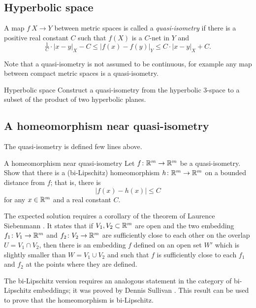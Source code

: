 \subsection*{Hyperbolic space}

A map $f\:X\to Y$ between metric spaces is called a \emph{quasi-isometry} if there is a positive real constant $C$ such that $f(X)$ is a $C$-net in $Y$ and
$$\tfrac{1}{C}\cdot|x-y|_X-C
\le 
|f(x)-f(y)|_Y\le C\cdot|x-y|_X+C.$$

Note that a quasi-isometry is not assumed to be continuous, for example any map between compact metric spaces is a quasi-isometry.

\begin{pr}{}{Hyperbolic space}\label{Hyperbolic space}
Construct a quasi-isometry
from the hyperbolic $3$-space 
to a subset 
of the product of two hyperbolic planes.
\end{pr}

\subsection*{A homeomorphism near quasi-isometry\thm}

The quasi-isometry is defined few lines above.

\begin{pr}{\thm}{A homeomorphism near quasi-isometry}\label{hom-near-QI} 
Let $f\colon\mathbb{R}^m\to\mathbb{R}^m$ be a quasi-isometry.
Show that there is a (bi-Lipschitz) homeomorphism 
$h\colon\mathbb{R}^m\to\mathbb{R}^m$ on a bounded distance from $f$;
that is, there is 
$$|f(x)-h(x)|\le C$$
for any $x\in\mathbb{R}^m$ and a real constant $C$.
\end{pr}

The expected solution requires a corollary of the theorem  of Laurence Siebenmann \cite{siebenmann}.
It states that 
if $V_1, V_2\subset\mathbb{R}^m$ are open
and the two embedding $f_1\colon V_1\to\mathbb{R}^m$ and $f_2\colon V_2\to\mathbb{R}^m$ 
are sufficiently close to each other 
on the overlap $U=V_1\cap V_2$, 
then
there is an embedding $f$ defined on an open set $W'$
which is slightly smaller than $W=V_1\cup V_2$
and such that $f$ is sufficiently close to each $f_1$ and $f_2$ at the points where they are defined.

The  bi-Lipschitz version requires 
an analogous statement in the category of bi-Lipschitz embeddings;
it was proved by
Dennis Sullivan \cite[see][]{sullivan}.
This result can be used to prove that the homeomorphism is bi-Lipschitz.

